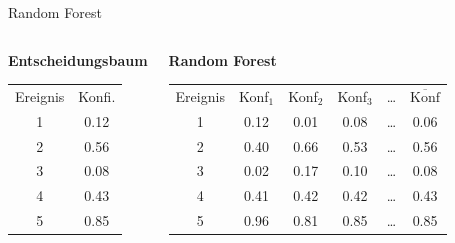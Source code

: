 \documentclass[aspectratio=1610, professionalfonts, 9pt]{beamer}
\begin{document}
\begin{frame}{Random Forest}
  \begin{columns}[onlytextwidth]
	\begin{centering}
	  {\Large \bf Entscheidungsbaum}
	  \begin{table}
	  \centering
	  \begin{tabular}{c c}
		\toprule
		Ereignis & Konfi. \\
		\cmidrule(r){1-1} \cmidrule(l){2-2}
		1 & \num{0.12} \\
		2 & \num{0.56} \\
		3 & \num{0.08} \\
		4 & \num{0.43} \\
		5 & \num{0.85} \\
		\bottomrule
	  \end{tabular}
	\end{table}
	\end{centering}
	\column{.6\textwidth}
	\begin{centering}
	  {\Large \bf Random Forest}
	\begin{table}
	  \centering
	  \begin{tabular}{c c c c c c}
		\toprule
		Ereignis & Konf$_{1}$ & Konf$_{2}$ & Konf$_{3}$ & \dots & $\overline{\text{Konf}}$ \\
		\cmidrule(r){1-1} \cmidrule(lr){2-5} \cmidrule(l){6-6}
		1 & \num{0.12} & \num{0.01} & \num{0.08} & \dots & \num{0.06} \\
		2 & \num{0.40} & \num{0.66} & \num{0.53} & \dots & \num{0.56} \\
		3 & \num{0.02} & \num{0.17} & \num{0.10} & \dots & \num{0.08} \\
		4 & \num{0.41} & \num{0.42} & \num{0.42} & \dots & \num{0.43} \\
		5 & \num{0.96} & \num{0.81} & \num{0.85} & \dots & \num{0.85} \\
		\bottomrule
	  \end{tabular}
	\end{table}
	\end{centering}
  \end{columns}
\end{frame}
\end{document}
